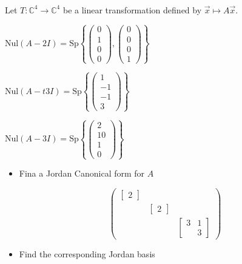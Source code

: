 \documentclass[11pt,fleqn]{book} %
\begin{document}
\begin{example}
{~~~}
    
    Let $T: \mathbb{C}^4 \to \mathbb{C}^4$ be a linear transformation defined by $\vec{x} \mapsto A\vec{x}$. 
    
    $\mathrm{Nul}(A - 2I) = \mathrm{Sp} \left\{ \begin{pmatrix} 0\\1\\0\\0 \end{pmatrix}, \begin{pmatrix} 0\\0\\0\\1 \end{pmatrix} \right\}$
    
    $\mathrm{Nul}(A -t 3I) = \mathrm{Sp} \left\{ \begin{pmatrix} 1\\-1\\-1\\3 \end{pmatrix} \right\}$
    
    $\mathrm{Nul}(A - 3I) = \mathrm{Sp} \left\{ \begin{pmatrix} 2\\10\\1\\0 \end{pmatrix} \right\}$
    
    \begin{itemize}
        \item Fina a Jordan Canonical form for $A$
        
        $$\begin{pmatrix} \begin{bmatrix} 2 \end{bmatrix} \\ & \begin{bmatrix} 2 \end{bmatrix} \\ & &\begin{bmatrix} 3 &1 \\ &3 \end{bmatrix} \end{pmatrix}$$
        
        \item Find the corresponding Jordan basis
        

\end{itemize}
\end{example}
\end{document}
